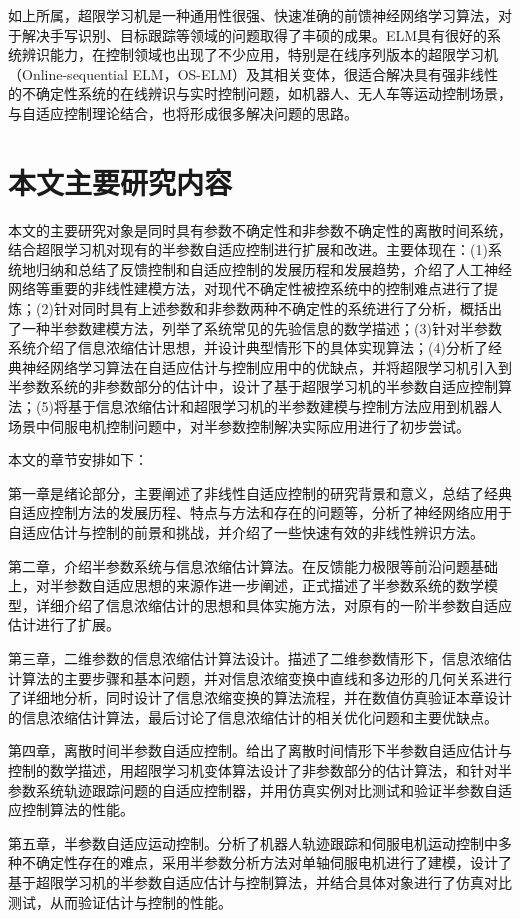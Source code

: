 如上所属，超限学习机是一种通用性很强、快速准确的前馈神经网络学习算法，对于解决手写识别、目标跟踪等领域的问题取得了丰硕的成果。ELM具有很好的系统辨识能力，在控制领域也出现了不少应用，特别是在线序列版本的超限学习机（Online-sequential ELM，OS-ELM）及其相关变体，很适合解决具有强非线性的不确定性系统的在线辨识与实时控制问题，如机器人、无人车等运动控制场景，与自适应控制理论结合，也将形成很多解决问题的思路。

\section{本文主要研究内容}\label{sect:1.3}

本文的主要研究对象是同时具有参数不确定性和非参数不确定性的离散时间系统，结合超限学习机对现有的半参数自适应控制进行扩展和改进。主要体现在：(1)系统地归纳和总结了反馈控制和自适应控制的发展历程和发展趋势，介绍了人工神经网络等重要的非线性建模方法，对现代不确定性被控系统中的控制难点进行了提炼；(2)针对同时具有上述参数和非参数两种不确定性的系统进行了分析，概括出了一种半参数建模方法，列举了系统常见的先验信息的数学描述；(3)针对半参数系统介绍了信息浓缩估计思想，并设计典型情形下的具体实现算法；(4)分析了经典神经网络学习算法在自适应估计与控制应用中的优缺点，并将超限学习机引入到半参数系统的非参数部分的估计中，设计了基于超限学习机的半参数自适应控制算法；(5)将基于信息浓缩估计和超限学习机的半参数建模与控制方法应用到机器人场景中伺服电机控制问题中，对半参数控制解决实际应用进行了初步尝试。

本文的章节安排如下：

第一章是绪论部分，主要阐述了非线性自适应控制的研究背景和意义，总结了经典自适应控制方法的发展历程、特点与方法和存在的问题等，分析了神经网络应用于自适应估计与控制的前景和挑战，并介绍了一些快速有效的非线性辨识方法。

第二章，介绍半参数系统与信息浓缩估计算法。在反馈能力极限等前沿问题基础上，对半参数自适应思想的来源作进一步阐述，正式描述了半参数系统的数学模型，详细介绍了信息浓缩估计的思想和具体实施方法，对原有的一阶半参数自适应估计进行了扩展。

第三章，二维参数的信息浓缩估计算法设计。描述了二维参数情形下，信息浓缩估计算法的主要步骤和基本问题，并对信息浓缩变换中直线和多边形的几何关系进行了详细地分析，同时设计了信息浓缩变换的算法流程，并在数值仿真验证本章设计的信息浓缩估计算法，最后讨论了信息浓缩估计的相关优化问题和主要优缺点。

第四章，离散时间半参数自适应控制。给出了离散时间情形下半参数自适应估计与控制的数学描述，用超限学习机变体算法设计了非参数部分的估计算法，和针对半参数系统轨迹跟踪问题的自适应控制器，并用仿真实例对比测试和验证半参数自适应控制算法的性能。

第五章，半参数自适应运动控制。分析了机器人轨迹跟踪和伺服电机运动控制中多种不确定性存在的难点，采用半参数分析方法对单轴伺服电机进行了建模，设计了基于超限学习机的半参数自适应估计与控制算法，并结合具体对象进行了仿真对比测试，从而验证估计与控制的性能。
